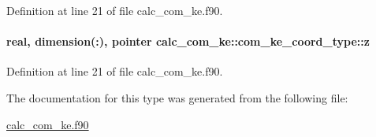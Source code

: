 Definition at line 21 of file calc\-\_\-com\-\_\-ke.\-f90.

\hypertarget{structcalc__com__ke_1_1com__ke__coord__type_a4a39b0e8001030435d38ece2eb81fa3c}{
\paragraph[{z}]{\setlength{\rightskip}{0pt plus 5cm}real, dimension(\-:), pointer calc\-\_\-com\-\_\-ke\-::com\-\_\-ke\-\_\-coord\-\_\-type\-::z}}\label{structcalc__com__ke_1_1com__ke__coord__type_a4a39b0e8001030435d38ece2eb81fa3c}


Definition at line 21 of file calc\-\_\-com\-\_\-ke.\-f90.



The documentation for this type was generated from the following file\-:\begin{DoxyCompactItemize}
\item 
\hyperlink{calc__com__ke_8f90}{calc\-\_\-com\-\_\-ke.\-f90}\end{DoxyCompactItemize}
